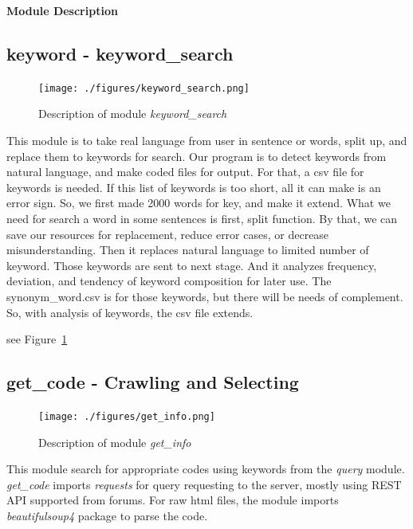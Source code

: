 \documentclass[conference]{IEEEtran}
\begin{document}
\textbf{Module Description}

\subsection{keyword - keyword\_search} %
\label{sub:keyword_search}
\begin{figure}[ht]
\centering
\texttt{[image: ./figures/keyword\_search.png]}
\caption{Description of module \textit{keyword\_search}}
\label{keyword_search}
\end{figure}


This module is to take real language from user in sentence or words, split up, and replace them to keywords for search. Our program is to detect keywords from natural language, and make coded files for output. For that, a csv file for keywords is needed. If this list of keywords is too short, all it can make is an error sign. So, we first made 2000 words for key, and make it extend. What we need for search a word in some sentences is first, split function. By that, we can save our resources for replacement, reduce error cases, or decrease misunderstanding. Then it replaces natural language to limited number of keyword. Those keywords are sent to next stage. And it analyzes frequency, deviation, and tendency of keyword composition for later use. The synonym\_word.csv is for those keywords, but there will be needs of complement. So, with analysis of keywords, the csv file extends. 


see Figure~\ref{keyword_search}

\subsection{get\_code - Crawling and Selecting} %
\label{sub:get_code}
\begin{figure}[ht]
\centering
\texttt{[image: ./figures/get\_info.png]}
\caption{Description of module \textit{get\_info}}
\label{get_info}
\end{figure}

This module search for appropriate codes using keywords from the \textit{query} module.
\textit{get\_code} imports \textit{requests} for query requesting to the server, mostly using REST API supported from forums.
For raw html files, the module imports \textit{beautifulsoup4} package to parse the code.
\end{document}

